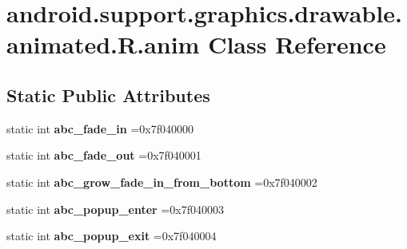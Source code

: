 \hypertarget{classandroid_1_1support_1_1graphics_1_1drawable_1_1animated_1_1R_1_1anim}{}\section{android.\+support.\+graphics.\+drawable.\+animated.\+R.\+anim Class Reference}
\label{classandroid_1_1support_1_1graphics_1_1drawable_1_1animated_1_1R_1_1anim}
\subsection*{Static Public Attributes}
\begin{DoxyCompactItemize}
\item 
\mbox{\label{classandroid_1_1support_1_1graphics_1_1drawable_1_1animated_1_1R_1_1anim_a3cfe0e51bb4e8bc0f3d66a7eb7c96ece}} 
static int {\bfseries abc\+\_\+fade\+\_\+in} =0x7f040000
\item 
\mbox{\label{classandroid_1_1support_1_1graphics_1_1drawable_1_1animated_1_1R_1_1anim_abf9047242be624ecc0ef35ecdb16eaf7}} 
static int {\bfseries abc\+\_\+fade\+\_\+out} =0x7f040001
\item 
\mbox{\label{classandroid_1_1support_1_1graphics_1_1drawable_1_1animated_1_1R_1_1anim_a0e7f940c2019053d0c4b4b113b65e4ca}} 
static int {\bfseries abc\+\_\+grow\+\_\+fade\+\_\+in\+\_\+from\+\_\+bottom} =0x7f040002
\item 
\mbox{\label{classandroid_1_1support_1_1graphics_1_1drawable_1_1animated_1_1R_1_1anim_a818b1f45b50fa4d67d5e67b353b32ea5}} 
static int {\bfseries abc\+\_\+popup\+\_\+enter} =0x7f040003
\item 
\mbox{\label{classandroid_1_1support_1_1graphics_1_1drawable_1_1animated_1_1R_1_1anim_ab6bda3ad24c8d69a3afce41f62d5c11e}} 
static int {\bfseries abc\+\_\+popup\+\_\+exit} =0x7f040004
\item 

\end{DoxyCompactItemize}
